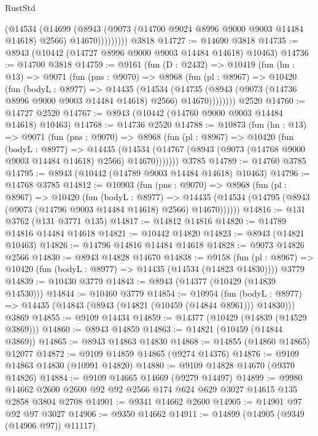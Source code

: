 \begin{lexlean}{RustStd}
\begin{coremodule}
{\begin{coremodule}
{{{{{{{{{{{{{{{{{{{{{{{{{{{{{{{{{{{{{{{                (@14534
                  (@14699
                    (@8943
                      (@9073 (@14700 @9024 @8996 @9000 @9003 @14484 @14618) @2566)
                      @14670)))))))))
    @3818
@14727 := @14690 @3818
@14735 := @8943 (@10442 (@14727 @8996 @9000 @9003 @14484 @14618) @10463)
@14736 := @14700 @3818
@14759 := @9161
    (fun (D : @2432) =>
    @10419
      (fun (hn : @13) =>
      @9071
        (fun (pns : @9070) =>
        @8968
          (fun (pl : @8967) =>
          @10420
            (fun (bodyL : @8977) =>
            @14435
              (@14534
                (@14735 (@8943 (@9073 (@14736 @8996 @9000 @9003 @14484 @14618) @2566) @14670))))))))
    @2520
@14760 := @14727 @2520
@14767 := @8943 (@10442 (@14760 @9000 @9003 @14484 @14618) @10463)
@14768 := @14736 @2520
@14788 := @10873
    (fun (hn : @13) =>
    @9071
      (fun (pns : @9070) =>
      @8968
        (fun (pl : @8967) =>
        @10420
          (fun (bodyL : @8977) =>
          @14435
            (@14534 (@14767 (@8943 (@9073 (@14768 @9000 @9003 @14484 @14618) @2566) @14670)))))))
    @3785
@14789 := @14760 @3785
@14795 := @8943 (@10442 (@14789 @9003 @14484 @14618) @10463)
@14796 := @14768 @3785
@14812 := @10903
    (fun (pns : @9070) =>
    @8968
      (fun (pl : @8967) =>
      @10420
        (fun (bodyL : @8977) =>
        @14435 (@14534 (@14795 (@8943 (@9073 (@14796 @9003 @14484 @14618) @2566) @14670))))))
@14816 := @131 @3762 (@131 @3771 @135)
@14817 := @14812 @14816
@14820 := @14789 @14816 @14484 @14618
@14821 := @10442 @14820
@14823 := @8943 (@14821 @10463)
@14826 := @14796 @14816 @14484 @14618
@14828 := @9073 @14826 @2566
@14830 := @8943 @14828 @14670
@14838 := @9158
    (fun (pl : @8967) => @10420 (fun (bodyL : @8977) => @14435 (@14534 (@14823 @14830))))
    @3779
@14839 := @10430 @3779
@14843 := @8943 (@14377 (@10429 (@14839 @14530)))
@14844 := @10460 @3779
@14854 := @10954
    (fun (bodyL : @8977) => @14435 (@14843 (@8943 (@14821 (@10459 (@14844 @8961))) @14830)))
    @3869
@14855 := @9109 @14434
@14859 := @14377 (@10429 (@14839 (@14529 @3869)))
@14860 := @8943 @14859
@14863 := @14821 (@10459 (@14844 @3869))
@14865 := @8943 @14863 @14830
@14868 := @14855 (@14860 @14865) @12077
@14872 := @9109 @14859 @14865 (@9274 @14376)
@14876 := @9109 @14863 @14830 (@10991 @14820)
@14880 := @9109 @14828 @14670 (@9370 @14826)
@14884 := @9109 @14665 @14669 (@9279 @14497)
@14899 := @9980 @14662 @2600 @2600 @92 @92 @2566 @174 @624 @629 @3027 @14615 @135 @2858 @3804 @2708
@14901 := @9341 @14662 @2600
@14905 := @14901 @97 @92 @97 @3027
@14906 := @9350 @14662
@14911 := @14899 (@14905 (@9349 (@14906 @97)) @11117)
}}}}}}}}}}}}}}}}}}}}}}}}}}}}}}}}}}}}}}}
\end{coremodule}}
\end{coremodule}
\end{lexlean}
